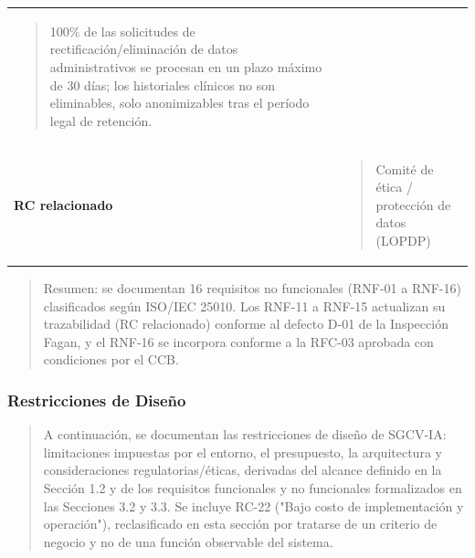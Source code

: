 \documentclass[
]{article}
\begin{document}
{\begin{longtable}[]{@{}
  >{\raggedright\arraybackslash}p{}
  >{\raggedright\arraybackslash}p{}@{}}
\begin{minipage}[t]{\linewidth}
\begin{quote}
100\% de las solicitudes de rectificación/eliminación de datos
administrativos se procesan en un plazo máximo de 30 días; los
historiales clínicos no son eliminables, solo anonimizables tras el
período legal de retención.
\end{quote}
\end{minipage} \\
\textbf{RC relacionado} & \begin{minipage}[t]{\linewidth}\raggedright
\begin{quote}
Comité de ética / protección de datos (LOPDP)
\end{quote}
\end{minipage} \\
\end{longtable}
}

\begin{quote}
Resumen: se documentan 16 requisitos no funcionales (RNF-01 a RNF-16)
clasificados según ISO/IEC 25010. Los RNF-11 a RNF-15 actualizan su
trazabilidad (RC relacionado) conforme al defecto D-01 de la
Inspección Fagan, y el RNF-16 se incorpora conforme a la RFC-03
aprobada con condiciones por el CCB.
\end{quote}

\subsubsection{Restricciones de
Diseño}\label{restricciones-de-diseuxf1o}

\begin{quote}
A continuación, se documentan las restricciones de diseño de SGCV-IA:
limitaciones impuestas por el entorno, el presupuesto, la arquitectura y
consideraciones regulatorias/éticas, derivadas del alcance definido en
la Sección 1.2 y de los requisitos funcionales y no funcionales
formalizados en las Secciones 3.2 y 3.3. Se incluye RC-22 ("Bajo costo
de implementación y operación"), reclasificado en esta sección por
tratarse de un criterio de negocio y no de una función observable del
sistema.
\end{quote}
\end{document}
